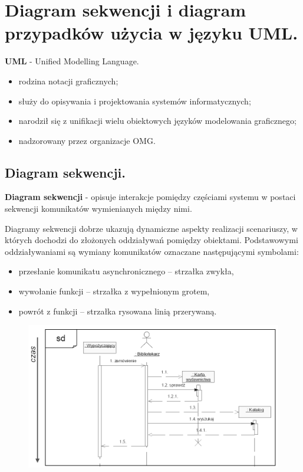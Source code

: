 \documentclass[12pt]{article}
\begin{document}
    \newpage

    \section{Diagram sekwencji i diagram przypadków użycia w języku UML.}

    \begin{definition}
        \textbf{UML} - Unified Modelling Language.
        \begin{itemize}
            \item rodzina notacji graficznych;
            \item służy do opisywania i projektowania systemów informatycznych;
            \item narodził się z unifikacji wielu obiektowych języków modelowania graficznego;
            \item nadzorowany przez organizacje OMG.
        \end{itemize}
    \end{definition}

    \subsection{Diagram sekwencji.}

    \begin{definition}
        \textbf{Diagram sekwencji} - opisuje interakcje pomiędzy częściami systemu w postaci sekwencji komunikatów
        wymienianych między nimi.

        Diagramy sekwencji dobrze ukazują dynamiczne aspekty realizacji scenariuszy, w których dochodzi do złożonych
        oddziaływań pomiędzy obiektami. Podstawowymi oddziaływaniami są wymiany komunikatów oznaczane następującymi
        symbolami:
        \begin{itemize}
            \item przesłanie komunikatu asynchronicznego – strzałka zwykła,
            \item wywołanie funkcji – strzałka z wypełnionym grotem,
            \item powrót z funkcji – strzałka rysowana linią przerywaną.
        \end{itemize}
    \end{definition}

    \begin{figure}[H]
        \includegraphics[width=\linewidth]{uml_sek.png}
    \end{figure}
\end{document}
